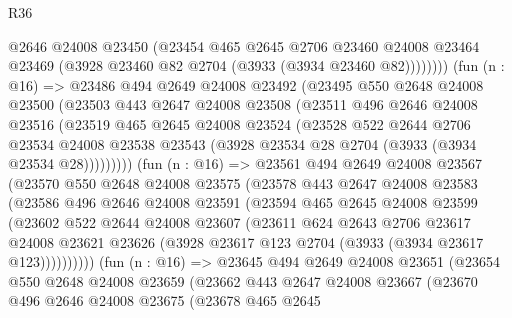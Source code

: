 \begin{lexlean}{R36}
\begin{coremodule}
                @2646
                @24008
                @23450
                (@23454
                  @465
                  @2645
                  @2706
                  @23460
                  @24008
                  @23464
                  @23469
                  (@3928 @23460 @82 @2704 (@3933 (@3934 @23460 @82))))))))
        (fun (n : @16) =>
        @23486
          @494
          @2649
          @24008
          @23492
          (@23495
            @550
            @2648
            @24008
            @23500
            (@23503
              @443
              @2647
              @24008
              @23508
              (@23511
                @496
                @2646
                @24008
                @23516
                (@23519
                  @465
                  @2645
                  @24008
                  @23524
                  (@23528
                    @522
                    @2644
                    @2706
                    @23534
                    @24008
                    @23538
                    @23543
                    (@3928 @23534 @28 @2704 (@3933 (@3934 @23534 @28)))))))))
        (fun (n : @16) =>
        @23561
          @494
          @2649
          @24008
          @23567
          (@23570
            @550
            @2648
            @24008
            @23575
            (@23578
              @443
              @2647
              @24008
              @23583
              (@23586
                @496
                @2646
                @24008
                @23591
                (@23594
                  @465
                  @2645
                  @24008
                  @23599
                  (@23602
                    @522
                    @2644
                    @24008
                    @23607
                    (@23611
                      @624
                      @2643
                      @2706
                      @23617
                      @24008
                      @23621
                      @23626
                      (@3928 @23617 @123 @2704 (@3933 (@3934 @23617 @123))))))))))
        (fun (n : @16) =>
        @23645
          @494
          @2649
          @24008
          @23651
          (@23654
            @550
            @2648
            @24008
            @23659
            (@23662
              @443
              @2647
              @24008
              @23667
              (@23670
                @496
                @2646
                @24008
                @23675
                (@23678
                  @465
                  @2645

\end{coremodule}
\end{lexlean}
